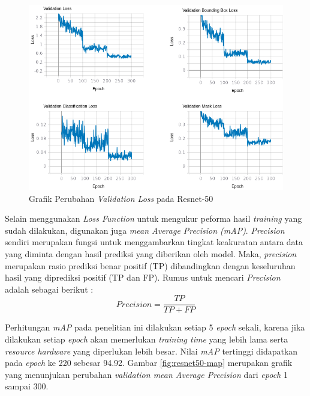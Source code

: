 \begin{figure}[h]
	\centering
	\includegraphics[scale=0.36]{gambar/resnet50-val.png}
	\caption{Grafik Perubahan \textit{Validation Loss} pada Resnet-50}
	\label{fig:resnet50-val}
\end{figure}

Selain menggunakan \textit{Loss Function} untuk mengukur peforma hasil \textit{training} yang sudah dilakukan, digunakan juga \textit{mean Average Precision (mAP)}. \textit{Precision} sendiri merupakan fungsi untuk menggambarkan tingkat keakuratan antara data yang diminta dengan hasil prediksi yang diberikan oleh model. Maka, \textit{precision} merupakan rasio prediksi benar positif (TP) dibandingkan dengan keseluruhan hasil yang diprediksi positif (TP dan FP). Rumus untuk mencari \textit{Precision} adalah sebagai berikut :
\begin{equation}
	Precision = \frac{TP}{TP+FP} 
\end{equation}

Perhitungan \textit{mAP} pada penelitian ini dilakukan setiap 5 \textit{epoch} sekali, karena jika dilakukan setiap \textit{epoch} akan memerlukan \textit{training time} yang lebih lama serta \textit{resource hardware} yang diperlukan lebih besar. Nilai \textit{mAP} tertinggi didapatkan pada \textit{epoch} ke 220 sebesar 94.92. Gambar \ref{fig:resnet50-map} merupakan grafik yang menunjukan perubahan \textit{validation mean Average Precision} dari \textit{epoch} 1 sampai 300. 

